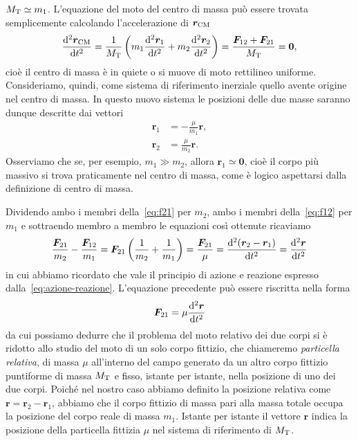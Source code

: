 $M_\textup{T}\simeq m_1$. L'equazione del moto del centro di massa può essere
trovata semplicemente calcolando l'accelerazione di $\bm{r}_\textup{CM}$
\begin{equation}
  \toder[2]{\bm{r}_\textup{CM}}{t} = \frac{1}{M_\textup{T}}
  \left(
    m_1\toder[2]{\bm{r}_1}{t} + m_2\toder[2]{\bm{r}_2}{t}
  \right) = \frac{\bm{F}_{12}+\bm{F}_{21}}{M_\textup{T}} = \bm{0},
\end{equation}
cioè il centro di massa è in quiete o si muove di moto rettilineo
uniforme. Consideriamo, quindi, come sistema di riferimento inerziale quello
avente origine nel centro di massa. In questo nuovo sistema le posizioni delle
due masse saranno dunque descritte dai vettori
\begin{subequations}
  \label{eq:r1-r2-nel-cdm}
  \begin{align}
    \bm{r}_1 &= -\frac{\mu}{m_1}\bm{r}, \label{eq:r1-nel-cdm}\\
    \bm{r}_2 &= \frac{\mu}{m_2}\bm{r}.
  \end{align}
\end{subequations}
Osserviamo che se, per esempio, $m_1\gg m_2$, allora $\bm{r}_1\simeq\bm{0}$,
cioè il corpo più massivo si trova praticamente nel centro di massa, come è
logico aspettarsi dalla definizione di centro di massa.

Dividendo ambo i membri della~\eqref{eq:f21} per $m_2$, ambo i membri
della~\eqref{eq:f12} per $m_1$ e sottraendo membro a membro le equazioni così
ottenute ricaviamo
\begin{equation}
  \frac{\bm{F}_{21}}{m_2}-\frac{\bm{F}_{12}}{m_1} = \bm{F}_{21}
  \left(
    \frac{1}{m_2}+\frac{1}{m_1}
  \right) = \frac{\bm{F}_{21}}{\mu} = \toder[2]{(\bm{r}_2-\bm{r}_1)}{t} =
  \toder[2]{\bm{r}}{t}
\end{equation}
in cui abbiamo ricordato che vale il principio di azione e reazione espresso
dalla~\eqref{eq:azione-reazione}. L'equazione precedente può essere riscritta
nella forma
\begin{equation}
  \label{eq:f21-mu}
  \bm{F}_{21}=\mu\toder[2]{\bm{r}}{t}
\end{equation}
da cui possiamo dedurre che il problema del moto relativo dei due corpi si è
ridotto allo studio del moto di un solo corpo fittizio, che chiameremo
\emph{particella relativa}, di massa $\mu$ all'interno del campo generato da un
altro corpo fittizio puntiforme di massa $M_\textup{T}$ e fisso, istante per
istante, nella posizione di uno dei due corpi. Poiché nel nostro caso abbiamo
definito la posizione relativa come $\bm{r}=\bm{r}_2 - \bm{r}_1$, abbiamo che il
corpo fittizio di massa pari alla massa totale occupa la posizione del corpo
reale di massa $m_1$. Istante per istante il vettore $\bm{r}$ indica la
posizione della particella fittizia $\mu$ nel sistema di riferimento di
$M_\textup{T}$.

